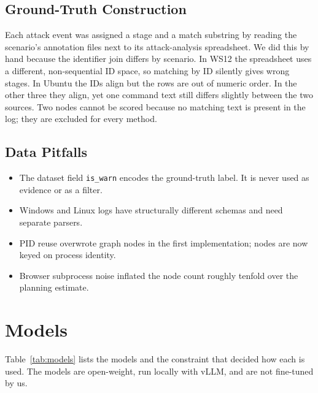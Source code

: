 \subsection{Ground-Truth Construction}
\label{sec:gt}
Each attack event was assigned a stage and a match substring by reading the scenario's annotation files next to its attack-analysis spreadsheet. We did this by hand because the identifier join differs by scenario. In WS12 the spreadsheet uses a different, non-sequential ID space, so matching by ID silently gives wrong stages. In Ubuntu the IDs align but the rows are out of numeric order. In the other three they align, yet one command text still differs slightly between the two sources. Two nodes cannot be scored because no matching text is present in the log; they are excluded for every method.

\subsection{Data Pitfalls}
\begin{itemize}
\item The dataset field \texttt{is\_warn} encodes the ground-truth label. It is never used as evidence or as a filter.
\item Windows and Linux logs have structurally different schemas and need separate parsers.
\item PID reuse overwrote graph nodes in the first implementation; nodes are now keyed on process identity.
\item Browser subprocess noise inflated the node count roughly tenfold over the planning estimate.
\end{itemize}

\section{Models}
Table~\ref{tab:models} lists the models and the constraint that decided how each is used. The models are open-weight, run locally with vLLM, and are not fine-tuned by us.

